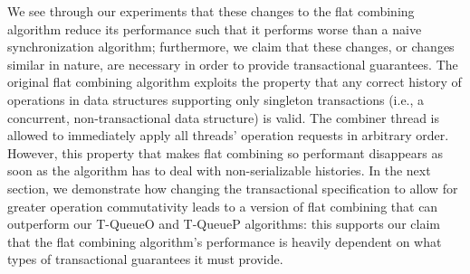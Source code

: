 We see through our experiments that these changes to the flat combining algorithm reduce its performance such that it performs worse than a naive synchronization algorithm; furthermore, we claim that these changes, or changes similar in nature, are necessary in order to provide transactional guarantees. The original flat combining algorithm exploits the property that any correct history of operations in data structures supporting only singleton transactions (i.e., a concurrent, non-transactional data structure) is valid. The combiner thread is allowed to immediately apply all threads' operation requests in arbitrary order. However, this property that makes flat combining so performant disappears as soon as the algorithm has to deal with non-serializable histories. In the next section, we demonstrate how changing the transactional specification to allow for greater operation commutativity leads to a version of flat combining that can outperform our T-QueueO and T-QueueP algorithms: this supports our claim that the flat combining algorithm's performance is heavily dependent on what types of transactional guarantees it must provide.
